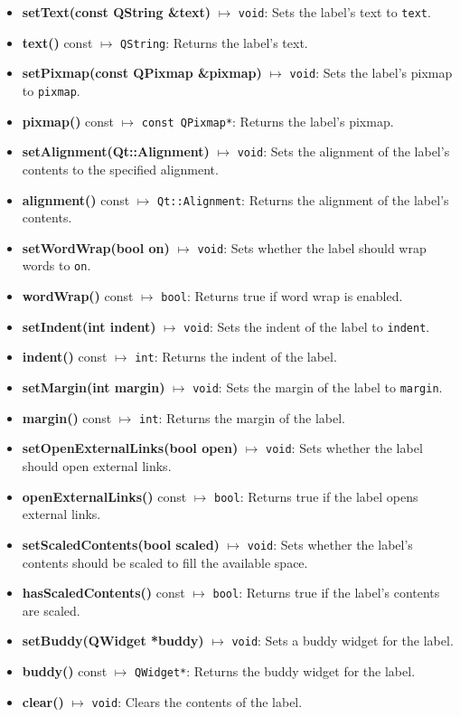 \documentclass{report}
\begin{document}
    \pagebreak 
    \begin{itemize}
        \item \textbf{setText(const QString \&text)} $\mapsto$ \texttt{void}: Sets the label's text to \texttt{text}.
        \item \textbf{text()} const $\mapsto$ \texttt{QString}: Returns the label's text.
        \item \textbf{setPixmap(const QPixmap \&pixmap)} $\mapsto$ \texttt{void}: Sets the label's pixmap to \texttt{pixmap}.
        \item \textbf{pixmap()} const $\mapsto$ \texttt{const QPixmap*}: Returns the label's pixmap.
        \item \textbf{setAlignment(Qt::Alignment)} $\mapsto$ \texttt{void}: Sets the alignment of the label's contents to the specified alignment.
        \item \textbf{alignment()} const $\mapsto$ \texttt{Qt::Alignment}: Returns the alignment of the label's contents.
        \item \textbf{setWordWrap(bool on)} $\mapsto$ \texttt{void}: Sets whether the label should wrap words to \texttt{on}.
        \item \textbf{wordWrap()} const $\mapsto$ \texttt{bool}: Returns true if word wrap is enabled.
        \item \textbf{setIndent(int indent)} $\mapsto$ \texttt{void}: Sets the indent of the label to \texttt{indent}.
        \item \textbf{indent()} const $\mapsto$ \texttt{int}: Returns the indent of the label.
        \item \textbf{setMargin(int margin)} $\mapsto$ \texttt{void}: Sets the margin of the label to \texttt{margin}.
        \item \textbf{margin()} const $\mapsto$ \texttt{int}: Returns the margin of the label.
        \item \textbf{setOpenExternalLinks(bool open)} $\mapsto$ \texttt{void}: Sets whether the label should open external links.
        \item \textbf{openExternalLinks()} const $\mapsto$ \texttt{bool}: Returns true if the label opens external links.
        \item \textbf{setScaledContents(bool scaled)} $\mapsto$ \texttt{void}: Sets whether the label's contents should be scaled to fill the available space.
        \item \textbf{hasScaledContents()} const $\mapsto$ \texttt{bool}: Returns true if the label's contents are scaled.
        \item \textbf{setBuddy(QWidget *buddy)} $\mapsto$ \texttt{void}: Sets a buddy widget for the label.
        \item \textbf{buddy()} const $\mapsto$ \texttt{QWidget*}: Returns the buddy widget for the label.
        \item \textbf{clear()} $\mapsto$ \texttt{void}: Clears the contents of the label.
    \end{itemize}
\end{document}
